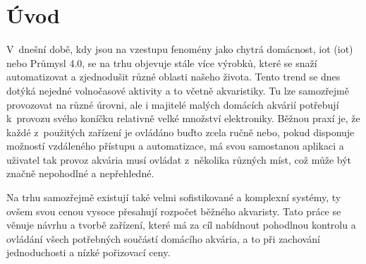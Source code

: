 \chapter*{Úvod}
{}


V~dnešní době, kdy jsou na vzestupu fenomény jako chytrá domácnost, \acs{iot} (\acl{iot}) nebo Průmysl 4.0, se na trhu objevuje stále více výrobků, které se snaží automatizovat a zjednodušit různé oblasti našeho života. Tento trend se dnes dotýká nejedné volnočasové aktivity a to včetně akvaristiky. Tu lze samozřejmě provozovat na různé úrovni, ale i majitelé malých domácích akvárií potřebují k~provozu svého koníčku relativně velké množství elektroniky. 
Běžnou praxí je, že každé z~použitých zařízení je ovládáno buďto zcela ručně nebo, pokud disponuje možností vzdáleného přístupu a automatizace, má svou samostanou aplikaci a uživatel tak provoz akvária musí ovládat z~několika různých míst, což může být značně nepohodlné a nepřehledné.

Na trhu samozřejmě existují také velmi sofistikované a komplexní systémy, ty ovšem svou cenou vysoce přesahují rozpočet běžného  akvaristy. Tato práce se věnuje návrhu a tvorbě zařízení, které má za cíl nabídnout pohodlnou kontrolu a ovládání všech potřebných součástí domácího akvária, a to při zachování jednoduchosti a nízké pořizovací ceny.
